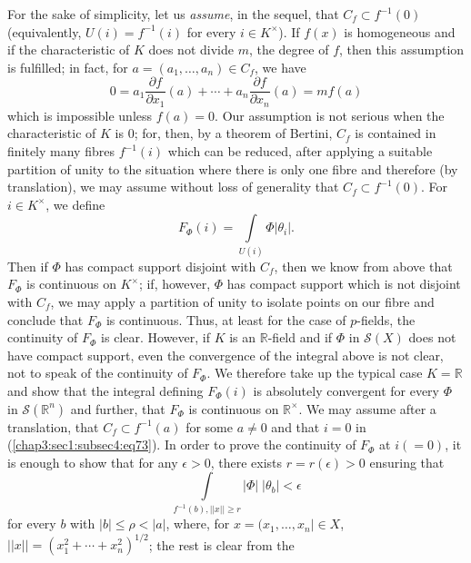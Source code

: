 For the sake of simplicity, let us {\em assume}, in the sequel, that
$C_{f}\subset f^{-1}(0)$ (equivalently, $U(i)=f^{-1}(i)$ for every
$i\in K^{\times}$). If $f(x)$ is homogeneous and if the characteristic
of $K$ does not divide $m$, the degree of $f$, then this assumption is
fulfilled; in fact, for $a=(a_{1},\ldots,a_{n})\in C_{f}$, we have
$$
0=a_{1}\frac{\partial f}{\partial x_{1}}(a)+\cdots+a_{n}\frac{\partial
  f}{\partial x_{n}}(a)=mf(a)
$$
which is impossible unless $f(a)=0$. Our assumption is not serious
when the characteristic of $K$ is $0$; for, then, by a theorem of
Bertini, $C_{f}$ is contained in finitely many fibres $f^{-1}(i)$
which can be reduced, after applying a suitable partition of unity to
the situation where there is only one fibre and therefore (by
translation), we may assume without loss of generality that
$C_{f}\subset f^{-1}(0)$. For $i\in K^{\times}$, we define 
\begin{equation*}
  F_{\Phi}(i)=\int\limits_{U(i)}\Phi|\theta_{i}|.
  \tag{73}\label{chap3:sec1:subsec4:eq73} 
\end{equation*}\pageoriginale
Then if $\Phi$ has compact support disjoint with $C_{f}$, then we know
from above that $F_{\Phi}$ is continuous on $K^{\times}$; if, however,
$\Phi$ has compact support which is not disjoint with $C_{f}$, we may
apply a partition of unity to isolate points on our fibre and conclude
that $F_{\Phi}$ is continuous. Thus, at least for the case of
$p$-fields, the continuity of $F_{\Phi}$ is clear. However, if $K$ is
an $\mathbb{R}$-field and if $\Phi$ in $\mathscr{S}(X)$ does not have
compact support, even the convergence of the integral above is not
clear, not to speak of the continuity of $F_{\Phi}$. We therefore take
up the typical case $K=\mathbb{R}$ and show that the integral defining
$F_{\Phi}(i)$ is absolutely convergent for every $\Phi$ in
$\mathscr{S}(\mathbb{R}^{n})$ and further, that $F_{\Phi}$ is continuous
on $\mathbb{R}^{\times}$. We may assume after a translation, that
$C_{f}\subset f^{-1}(a)$ for some $a\neq 0$ and that $i=0$ in
(\ref{chap3:sec1:subsec4:eq73}). In order to prove the continuity of $F_{\Phi}$ at $i(=0)$,
it is enough to show that for any $\epsilon>0$, there exists
$r=r(\epsilon)>0$ ensuring that
\begin{equation*}
\int\limits_{f^{-1}(b),||x||\geq
  r}|\Phi|\;|\theta_{b}|<\epsilon\tag{74}\label{chap3:sec1:subsec4:eq74}
\end{equation*}
for every $b$ with $|b|\leq \rho<|a|$, where, for
$x=(x_{1},\ldots,x_{n}|\in X$,
$||x||=(x^{2}_{1}+\cdots+x^{2}_{n})^{1/2}$; the rest is clear from the
